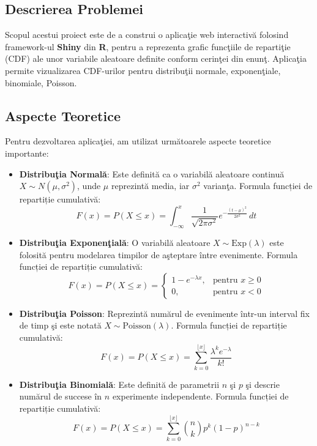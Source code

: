 \documentclass[a4paper,11pt]{article}
\begin{document}
\subsection*{Descrierea Problemei}

Scopul acestui proiect este de a construi o aplica\c{t}ie web interactiv\u{a} folosind framework-ul \textbf{Shiny} din \textbf{R}, pentru a reprezenta grafic func\c{t}iile de reparti\c{t}ie (CDF) ale unor variabile aleatoare definite conform cerin\c{t}ei din enun\c{t}. Aplica\c{t}ia permite vizualizarea CDF-urilor pentru distribu\c{t}ii normale, exponen\c{t}iale, binomiale, Poisson.

\subsection*{Aspecte Teoretice}
Pentru dezvoltarea aplica\c{t}iei, am utilizat urm\u{a}toarele aspecte teoretice importante:

\begin{itemize}
  \item \textbf{Distribu\c{t}ia Normal\u{a}}: Este definit\u{a} ca o variabil\u{a} aleatoare continu\u{a} $X \sim N(\mu, \sigma^2)$, unde $\mu$ reprezint\u{a} media, iar $\sigma^2$ varian\c{t}a.
  \newline
  Formula funcției de repartiție cumulativă:
  \[
  F(x) = P(X \leq x) = \int_{-\infty}^{x} \frac{1}{\sqrt{2\pi \sigma^2}} e^{-\frac{(t - \mu)^2}{2\sigma^2}} \, dt
  \]

  \item \textbf{Distribu\c{t}ia Exponen\c{t}ial\u{a}}: O variabil\u{a} aleatoare $X \sim \text{Exp}(\lambda)$ este folosit\u{a} pentru modelarea timpilor de a\c{s}teptare între evenimente.
  \newline
  Formula funcției de repartiție cumulativă:
  \[
  F(x) = P(X \leq x) = 
  \begin{cases}
  1 - e^{-\lambda x}, & \text{pentru } x \geq 0 \\
  0, & \text{pentru } x < 0
  \end{cases}
  \]

  \item \textbf{Distribu\c{t}ia Poisson}: Reprezint\u{a} num\u{a}rul de evenimente într-un interval fix de timp \c{s}i este notat\u{a} $X \sim \text{Poisson}(\lambda)$.
  \newline
  Formula funcției de repartiție cumulativă:
  \[
  F(x) = P(X \leq x) = \sum_{k=0}^{\lfloor x \rfloor} \frac{\lambda^k e^{-\lambda}}{k!}
  \]

  \item \textbf{Distribu\c{t}ia Binomial\u{a}}: Este definit\u{a} de parametrii $n$ \c{s}i $p$ \c{s}i descrie num\u{a}rul de succese în $n$ experimente independente.
  \newline
  Formula funcției de repartiție cumulativă:
  \[
  F(x) = P(X \leq x) = \sum_{k=0}^{\lfloor x \rfloor} \binom{n}{k} p^k (1 - p)^{n - k}
  \]
\end{itemize}
\end{document}
